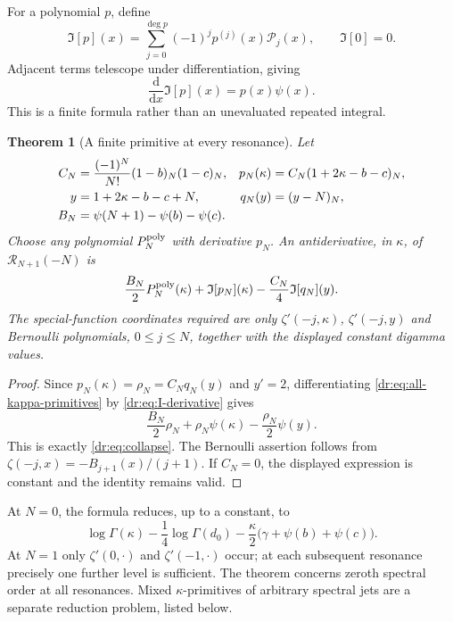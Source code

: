\documentclass[11pt,letterpaper]{article}
\numberwithin{equation}{section}
\newtheorem{theorem}{Theorem}[section]
\theoremstyle{definition}
\theoremstyle{remark}
\newcommand{\Rcal}{\mathcal R}
\newcommand{\Pcal}{\mathcal P}
\newcommand{\Ical}{\mathfrak I}
\begin{document}
For a polynomial $p$, define
\begin{equation}
 \Ical[p](x)=\sum_{j=0}^{\deg p}(-1)^jp^{(j)}(x)\Pcal_j(x),
 \qquad \Ical[0]=0.
 \label{dr:eq:I}
\end{equation}
Adjacent terms telescope under differentiation, giving
\begin{equation}
 \frac{\mathrm d}{\mathrm dx}\Ical[p](x)=p(x)\psi(x).
 \label{dr:eq:I-derivative}
\end{equation}
This is a finite formula rather than an unevaluated repeated integral.

\begin{theorem}[A finite primitive at every resonance]
\label{dr:thm:primitive}
Let
\begin{align}
 C_N&=\frac{(-1)^N}{N!}(1-b)_N(1-c)_N,
 &p_N(\kappa)&=C_N(1+2\kappa-b-c)_N,\notag\\
 y&=1+2\kappa-b-c+N,
 &q_N(y)&=(y-N)_N,\notag\\
 B_N&=\psi(N+1)-\psi(b)-\psi(c).
 \label{dr:eq:primitive-data}
\end{align}
Choose any polynomial $P_N^{\rm poly}$ with derivative $p_N$.
An antiderivative, in $\kappa$, of $\Rcal_{N+1}(-N)$ is
\begin{equation}
 \frac{B_N}{2}P_N^{\rm poly}(\kappa)
   +\Ical[p_N](\kappa)-\frac{C_N}{4}\Ical[q_N](y).
 \label{dr:eq:all-kappa-primitives}
\end{equation}
The special-function coordinates required are only
$\zeta'(-j,\kappa)$, $\zeta'(-j,y)$ and Bernoulli polynomials,
$0\leq j\leq N$, together with the displayed constant digamma values.
\end{theorem}

\begin{proof}
Since $p_N(\kappa)=\rho_N=C_Nq_N(y)$ and $y'=2$, differentiating
\eqref{dr:eq:all-kappa-primitives} by \eqref{dr:eq:I-derivative} gives
\[
 \frac{B_N}{2}\rho_N+\rho_N\psi(\kappa)
                        -\frac{\rho_N}{2}\psi(y).
\]
This is exactly \eqref{dr:eq:collapse}. The Bernoulli assertion follows
from $\zeta(-j,x)=-B_{j+1}(x)/(j+1)$. If $C_N=0$, the displayed expression is constant and the identity
remains valid.
\end{proof}

At $N=0$, the formula reduces, up to a constant, to
\begin{equation}
 \log\Gamma(\kappa)-\frac14\log\Gamma(d_0)
       -\frac\kappa2\bigl(\gamma+\psi(b)+\psi(c)\bigr).
 \label{dr:eq:first-kappa-primitive}
\end{equation}
At $N=1$ only $\zeta'(0,\cdot)$ and $\zeta'(-1,\cdot)$ occur;
at each subsequent resonance precisely one further level is sufficient.
The theorem concerns zeroth spectral order at all resonances. Mixed
$\kappa$-primitives of arbitrary spectral jets are a separate reduction
problem, listed below.
\end{document}
